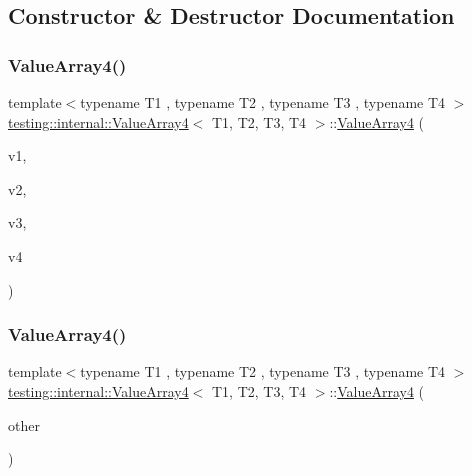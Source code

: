 \subsection{Constructor \& Destructor Documentation}
\mbox{\label{classtesting_1_1internal_1_1_value_array4_a5288bbb1a3149842ab13d689cf1fd48f}} 
\subsubsection{\texorpdfstring{ValueArray4()}{ValueArray4()}\hspace{0.1cm}{\footnotesize\ttfamily [1/2]}}
{\footnotesize\ttfamily template$<$typename T1 , typename T2 , typename T3 , typename T4 $>$ \\
\mbox{\hyperlink{classtesting_1_1internal_1_1_value_array4}{testing\+::internal\+::\+Value\+Array4}}$<$ T1, T2, T3, T4 $>$\+::\mbox{\hyperlink{classtesting_1_1internal_1_1_value_array4}{Value\+Array4}} (\begin{DoxyParamCaption}\item[{T1}]{v1,  }\item[{T2}]{v2,  }\item[{T3}]{v3,  }\item[{T4}]{v4 }\end{DoxyParamCaption})\hspace{0.3cm}{\ttfamily [inline]}}

\mbox{\label{classtesting_1_1internal_1_1_value_array4_a3703e95dc214c47d705cf68fdf2e262b}} 
\subsubsection{\texorpdfstring{ValueArray4()}{ValueArray4()}\hspace{0.1cm}{\footnotesize\ttfamily [2/2]}}
{\footnotesize\ttfamily template$<$typename T1 , typename T2 , typename T3 , typename T4 $>$ \\
\mbox{\hyperlink{classtesting_1_1internal_1_1_value_array4}{testing\+::internal\+::\+Value\+Array4}}$<$ T1, T2, T3, T4 $>$\+::\mbox{\hyperlink{classtesting_1_1internal_1_1_value_array4}{Value\+Array4}} (\begin{DoxyParamCaption}\item[{const \mbox{\hyperlink{classtesting_1_1internal_1_1_value_array4}{Value\+Array4}}$<$ T1, T2, T3, T4 $>$ \&}]{other }\end{DoxyParamCaption})\hspace{0.3cm}{\ttfamily [inline]}}



